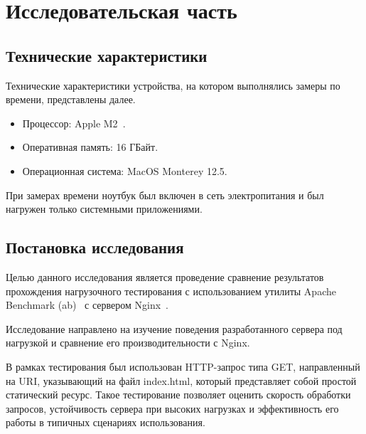 \chapter{Исследовательская часть}
\section{Технические характеристики}
Технические характеристики устройства, на котором выполнялись замеры по времени, представлены далее.

\begin{itemize}
	\item Процессор: Apple M2~\cite{M2}.
	\item Оперативная память: 16 ГБайт.
	\item Операционная система: MacOS Monterey 12.5.
\end{itemize}

При замерах времени ноутбук был включен в сеть электропитания и был нагружен только системными приложениями.

\section{Постановка исследования}
Целью данного исследования является проведение сравнение 
результатов прохождения нагрузочного тестирования с использованием утилиты 
Apache Benchmark (ab)~\cite{ab} с сервером Nginx~\cite{nginx}. 

Исследование направлено на изучение поведения разработанного сервера под нагрузкой и 
сравнение его производительности с Nginx.

В рамках тестирования был использован HTTP-запрос типа GET, направленный на URI, указывающий на файл index.html, который представляет собой простой статический ресурс.
Такое тестирование позволяет оценить скорость обработки запросов, устойчивость сервера при высоких нагрузках и эффективность его работы в типичных сценариях использования.

